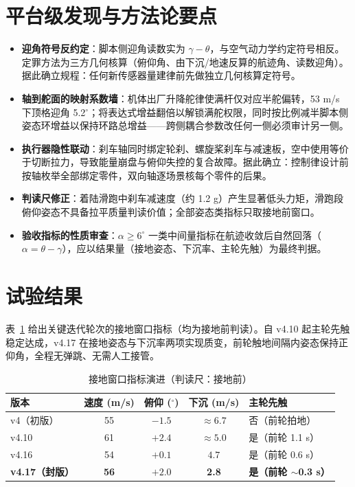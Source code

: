 \documentclass[12pt,UTF8,a4paper]{ctexart}
\begin{document}
\section{平台级发现与方法论要点}
\begin{itemize}
\item \textbf{迎角符号反约定}：脚本侧迎角读数实为 $\gamma-\theta$，与空气动力学约定符号相反。定罪方法为三方几何核算（俯仰角、由下沉/地速反算的航迹角、读数迎角）。据此确立规程：任何新传感器量建律前先做独立几何核算定符号。
\item \textbf{轴到舵面的映射系数墙}：机体出厂升降舵律使满杆仅对应半舵偏转，53 m/s 下顶格迎角 5.2$^\circ$；将表达式增益翻倍以解锁满舵权限，同时按比例减半脚本侧姿态环增益以保持环路总增益——跨侧耦合参数改任何一侧必须审计另一侧。
\item \textbf{执行器隐性联动}：刹车轴同时绑定轮刹、螺旋桨刹车与减速板，空中使用等价于切断拉力，导致能量崩盘与俯仰失控的复合故障。据此确立：控制律设计前按轴枚举全部绑定零件，双向轴逐场景核每个零件的后果。
\item \textbf{判读尺修正}：着陆滑跑中刹车减速度（约 1.2 g）产生显著低头力矩，滑跑段俯仰姿态不具备拉平质量判读价值；全部姿态类指标只取接地前窗口。
\item \textbf{验收指标的性质审查}：$\alpha\ge6^\circ$ 一类中间量指标在航迹收敛后自然回落（$\alpha = \theta - \gamma$），应以结果量（接地姿态、下沉率、主轮先触）为最终判据。
\end{itemize}

\section{试验结果}
表~\ref{tab:score} 给出关键迭代轮次的接地窗口指标（均为接地前判读）。自 v4.10 起主轮先触稳定达成，v4.17 在接地姿态与下沉率两项实现质变，前轮触地间隔内姿态保持正仰角，全程无弹跳、无需人工接管。

\begin{table}[h]\centering\small
\setlength{\tabcolsep}{5pt}
\caption{接地窗口指标演进（判读尺：接地前）}
\begin{tabular}{lcccl}
\toprule
版本 & 速度 (m/s) & 俯仰 ($^\circ$) & 下沉 (m/s) & 主轮先触 \\
\midrule
v4（初版） & 55 & $-1.5$ & $\approx 6.7$ & 否（前轮拍地） \\
v4.10 & 61 & $+2.4$ & $\approx 5.0$ & 是（前轮 1.1 s） \\
v4.16 & 54 & $+0.1$ & $4.7$ & 是（前轮 0.6 s） \\
\textbf{v4.17（封版）} & \textbf{56} & \textbf{$+2.0$} & \textbf{2.8} & \textbf{是（前轮 $\sim$0.3 s）} \\
\bottomrule
\end{tabular}\label{tab:score}
\end{table}
\end{document}
